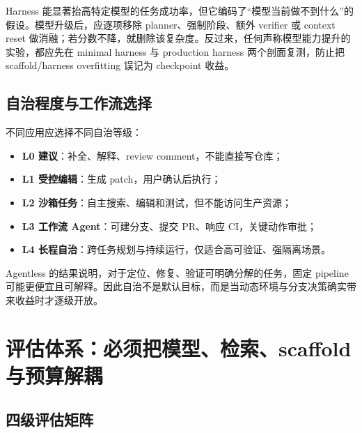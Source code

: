 \documentclass[10pt,a4paper,UTF8,fontset=none]{ctexart}
\begin{document}
\begin{keybox}
Harness 能显著抬高特定模型的任务成功率，但它编码了“模型当前做不到什么”的假设。模型升级后，应逐项移除 planner、强制阶段、额外 verifier 或 context reset 做消融；若分数不降，就删除该复杂度。反过来，任何声称模型能力提升的实验，都应先在 minimal harness 与 production harness 两个剖面复测，防止把 scaffold/harness overfitting 误记为 checkpoint 收益。
\end{keybox}

\subsection{自治程度与工作流选择}

不同应用应选择不同自治等级：

\begin{itemize}
  \item \textbf{L0 建议}：补全、解释、review comment，不能直接写仓库；
  \item \textbf{L1 受控编辑}：生成 patch，用户确认后执行；
  \item \textbf{L2 沙箱任务}：自主搜索、编辑和测试，但不能访问生产资源；
  \item \textbf{L3 工作流 Agent}：可建分支、提交 PR、响应 CI，关键动作审批；
  \item \textbf{L4 长程自治}：跨任务规划与持续运行，仅适合高可验证、强隔离场景。
\end{itemize}

Agentless 的结果说明，对于定位、修复、验证可明确分解的任务，固定 pipeline 可能更便宜且可解释\cite{xia2024agentless}。因此自治不是默认目标，而是当动态环境与分支决策确实带来收益时才逐级开放。

\section{评估体系：必须把模型、检索、scaffold 与预算解耦}

\subsection{四级评估矩阵}
\end{document}
